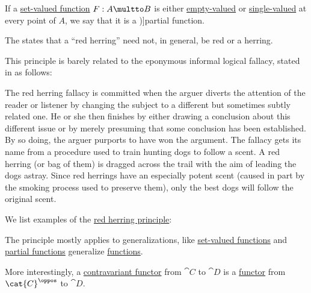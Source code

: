 \begin{definition}\label{def:partial_function}
  If a \hyperref[def:set_valued_function]{set-valued function} \( F: A \multto B \) is either \hyperref[def:set_valued_function/value_cardinality/empty]{empty-valued} or \hyperref[def:set_valued_function/value_cardinality/single]{single-valued} at every point of \( A \), we say that it is a \term[ru=частичное отображение (\cite[35]{Мальцев1970АлгебраическиеСистемы})]{partial function}.
\end{definition}

\begin{remark}\label{rem:red_herring_principle}
  The  states that a \enquote{red herring} need not, in general, be red or a herring.
\end{remark}
\begin{comments}
  \item This principle is barely related to the eponymous informal logical fallacy, stated in \cite[\S 3.2.8]{Hurley2023LogicIntroduction} as follows:
  \begin{displayquote}
    The red herring fallacy is committed when the arguer diverts the attention of the reader or listener by changing the subject to a different but sometimes subtly related one. He or she then finishes by either drawing a conclusion about this different issue or by merely presuming that some conclusion has been established. By so doing, the arguer purports to have won the argument. The fallacy gets its name from a procedure used to train hunting dogs to follow a scent. A red herring (or bag of them) is dragged across the trail with the aim of leading the dogs astray. Since red herrings have an especially potent scent (caused in part by the smoking process used to preserve them), only the best dogs will follow the original scent.
  \end{displayquote}
\end{comments}

\begin{example}\label{ex:rem:red_herring_principle}
  We list examples of the \hyperref[rem:red_herring_principle]{red herring principle}:
  \begin{thmenum}
     The principle mostly applies to generalizations, like \hyperref[def:set_valued_function]{set-valued functions} and \hyperref[def:partial_function]{partial functions} generalize \hyperref[def:function]{functions}.

     More interestingly, a \hyperref[def:contravariant_functor]{contravariant functor} from \( \cat{C} \) to \( \cat{D} \) is a \hyperref[def:functor]{functor} from \( \cat{C}^{\oppos} \) to \( \cat{D} \).
  \end{thmenum}
\end{example}

